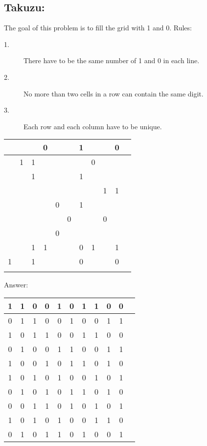 \documentclass{article}
\begin{document}
\subsection*{Takuzu:}
The goal of this problem is to fill the grid with 1 and 0. 
Rules:
\begin{description}
\item[1.] There have to be the same number of 1 and 0 in each line.
\item[2.] No more than two cells in a row can contain the same digit.
\item[3.] Each row and each column have to be unique.
\end{description}

\begin{table}[ht]
\centering
\begin{tabular}{|c|c|c|c|c|c|c|c|c|c|c|}
\hline   &   &   & 0 &   &   & 1 &   &   & 0 \\ 
\hline   & 1 & 1 &   &   &   &   & 0 &   &   \\ 
\hline   &   & 1 &   &   &   & 1 &   &   &   \\ 
\hline   &   &   &   &   &   &   &   & 1 & 1 \\ 
\hline   &   &   &   & 0 &   & 1 &   &   &   \\ 
\hline   &   &   &   &   & 0 &   &   & 0 &   \\ 
\hline   &   &   &   & 0 &   &   &   &   &   \\ 
\hline   &   & 1 & 1 &   &   & 0 & 1 &   & 1 \\ 
\hline 1 &   & 1 &   &   &   & 0 &   &   & 0 \\ 
\hline   &   &   &   &   &   &   &   &   &   \\
\hline
\end{tabular}
\end{table} 

Answer:
\begin{table}[ht]
\centering
\begin{tabular}{|c|c|c|c|c|c|c|c|c|c|c|}
\hline 1 & 1 & 0 & 0 & 1 & 0 & 1 & 1 & 0 & 0 \\ 
\hline 0 & 1 & 1 & 0 & 0 & 1 & 0 & 0 & 1 & 1 \\ 
\hline 1 & 0 & 1 & 1 & 0 & 0 & 1 & 1 & 0 & 0 \\ 
\hline 0 & 1 & 0 & 0 & 1 & 1 & 0 & 0 & 1 & 1 \\ 
\hline 1 & 0 & 0 & 1 & 0 & 1 & 1 & 0 & 1 & 0 \\ 
\hline 1 & 0 & 1 & 0 & 1 & 0 & 0 & 1 & 0 & 1 \\ 
\hline 0 & 1 & 0 & 1 & 0 & 1 & 1 & 0 & 1 & 0 \\ 
\hline 0 & 0 & 1 & 1 & 0 & 1 & 0 & 1 & 0 & 1 \\ 
\hline 1 & 0 & 1 & 0 & 1 & 0 & 0 & 1 & 1 & 0 \\ 
\hline 0 & 1 & 0 & 1 & 1 & 0 & 1 & 0 & 0 & 1 \\
\hline
\end{tabular}
\end{table} 
\end{document}
